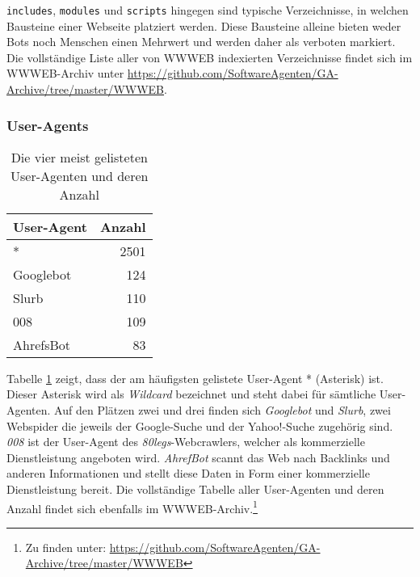 \texttt{includes}, \texttt{modules} und \texttt{scripts} hingegen sind typische
Verzeichnisse, in welchen Bausteine einer Webseite platziert werden. Diese
Bausteine alleine bieten weder Bots noch Menschen einen Mehrwert und werden
daher als verboten markiert. Die vollständige Liste aller von WWWEB indexierten
Verzeichnisse findet sich im WWWEB-Archiv unter \url{https://github.com/SoftwareAgenten/GA-Archive/tree/master/WWWEB}.

\subsubsection{User-Agents}
\label{ssub:user-agents}

\begin{table}[h]
  \begin{tabular}{ l|r }
    \textbf{User-Agent} & \textbf{Anzahl}\\
    \hline
    *         & 2501 \\
    Googlebot & 124  \\
    Slurb     & 110  \\
    008       & 109  \\
    AhrefsBot & 83   \\
  \end{tabular}
  
  \caption{Die vier meist gelisteten User-Agenten und deren Anzahl}
  \label{tab:maxUA}
\end{table}

Tabelle \ref{tab:maxUA} zeigt, dass der am häufigsten gelistete User-Agent *
(Asterisk) ist. Dieser Asterisk wird als \emph{Wildcard} bezeichnet und steht
dabei für sämtliche User-Agenten. Auf den Plätzen zwei und drei finden sich
\emph{Googlebot} und \emph{Slurb}, zwei Webspider die
jeweils der Google-Suche und der Yahoo!-Suche zugehörig sind. \emph{008} ist
der User-Agent des \emph{80legs}-Webcrawlers, welcher als kommerzielle
Dienstleistung angeboten wird. \emph{AhrefBot} scannt das Web nach Backlinks
und anderen Informationen und stellt diese Daten in Form einer kommerzielle
Dienstleistung bereit. Die vollständige Tabelle aller User-Agenten und deren
Anzahl findet sich ebenfalls im WWWEB-Archiv.\footnote{Zu finden unter:
\url{https://github.com/SoftwareAgenten/GA-Archive/tree/master/WWWEB}}
